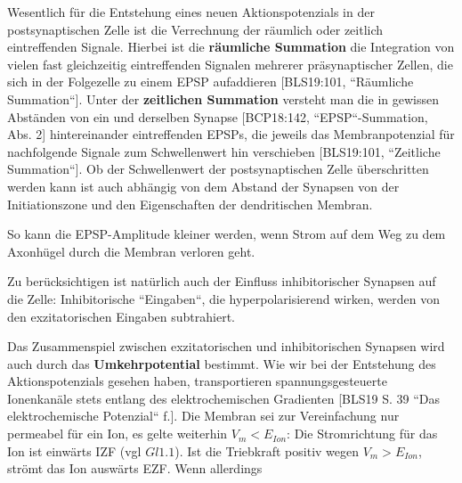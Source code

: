 {{Wesentlich für die Entstehung eines neuen Aktionspotenzials in der postsynaptischen Zelle ist die Verrechnung der räumlich oder zeitlich eintreffenden Signale. 
Hierbei ist die \textbf{räumliche Summation} die Integration von vielen fast gleichzeitig eintreffenden Signalen mehrerer präsynaptischer Zellen, die sich in der Folgezelle zu einem EPSP aufaddieren [BLS19:101, ``Räumliche Summation``]. 
Unter der \textbf{zeitlichen Summation} versteht man die in gewissen Abständen von ein und derselben Synapse [BCP18:142, ``EPSP``-Summation, Abs. 2] hintereinander eintreffenden EPSPs, die jeweils  das Membranpotenzial für nachfolgende Signale zum Schwellenwert hin verschieben [BLS19:101, ``Zeitliche Summation``]. 
Ob der Schwellenwert der postsynaptischen Zelle überschritten werden kann ist auch abhängig von dem Abstand der Synapsen von der Initiationszone und den Eigenschaften der dendritischen Membran.



So kann die EPSP-Amplitude kleiner werden, wenn Strom auf dem Weg zu dem Axonhügel durch die Membran verloren geht.

Zu berücksichtigen ist natürlich auch der Einfluss inhibitorischer Synapsen auf die Zelle: Inhibitorische ``Eingaben``, die hyperpolarisierend wirken, werden von den exzitatorischen Eingaben subtrahiert.






Das Zusammenspiel zwischen exzitatorischen und inhibitorischen Synapsen wird auch durch das \textbf{Umkehrpotential} bestimmt. 
Wie wir bei der Entstehung des Aktionspotenzials gesehen haben, transportieren spannungsgesteuerte Ionenkanäle stets entlang des elektrochemischen Gradienten [BLS19 S. 39 ``Das elektrochemische Potenzial`` f.]. 
Die Membran sei zur Vereinfachung nur permeabel für ein Ion, es gelte weiterhin $V_m < E_{Ion}$: Die Stromrichtung für das Ion ist einwärts IZF (vgl $Gl1.1$). Ist die Triebkraft positiv wegen $V_m > E_{Ion}$, strömt das Ion auswärts EZF. Wenn allerdings

}}
